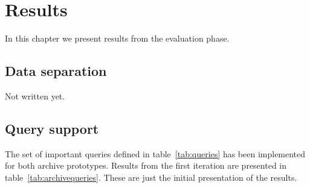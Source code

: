 \chapter{Results}
\label{chap:results}

In this chapter we present results from the evaluation phase.

\section{Data separation}
Not written yet.

\section{Query support}
The set of important queries defined in table~\ref{tab:queries} has been implemented for both archive prototypes. Results from the first iteration are presented in table~\ref{tab:archivequeries}. These are just the initial presentation of the results.
